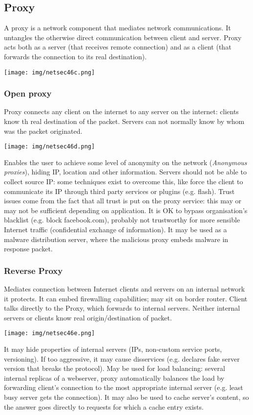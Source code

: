\documentclass[a4paper, 10pt, titlepage]{article}
\begin{document}
\subsection{Proxy}
A proxy is a network component that mediates network communications. It untangles the otherwise direct communication between client and server. Proxy acts both as a server (that receives remote connection) and as a client (that forwards the connection to its real destination).
\begin{center}
	\texttt{[image: img/netsec46c.png]}
\end{center}

\subsubsection*{Open proxy}
Proxy connects any client on the internet to any server on the internet: clients know th real destination of the packet. Servers can not normally know by whom was the packet originated.
\begin{center}
	\texttt{[image: img/netsec46d.png]}
\end{center}
Enables the user to achieve some level of anonymity on the network (\textit{Anonymous proxies}), hiding IP, location and other information. Servers should not be able to collect source IP: some techniques exist to overcome this, like force the client to communicate its IP through third party services or plugins (e.g. flash). Trust issues come from the fact that all trust is put on the proxy service: this may or may not be sufficient depending on application. It is OK to bypass organisation’s blacklist (e.g. block facebook.com), probably not trustworthy for more sensible Internet traffic (confidential exchange of information). It may be used as a malware distribution server, where the malicious proxy embeds malware in response packet.

\subsubsection*{Reverse Proxy}
Mediates connection between Internet clients and servers on an internal network it protects. It can embed firewalling capabilities; may sit on border router. Client talks directly to the Proxy, which forwards to internal servers. Neither internal servers or clients know real origin/destination of packet.
\begin{center}
	\texttt{[image: img/netsec46e.png]}
\end{center}
It may hide properties of internal servers (IPs, non-custom service ports, versioning). If too aggressive, it may cause disservices (e.g. declares fake server version that breaks the protocol). May be used for load balancing: several internal replicas of a webserver, proxy automatically balances the load by forwarding client’s connection to the most appropriate internal server (e.g. least busy server gets the connection). It may also be used to cache server’s content, so the answer goes directly to requests for which a cache entry exists.
\end{document}
